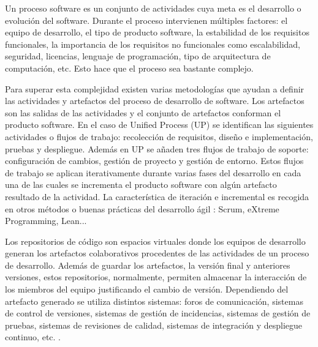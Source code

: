 

Un proceso software es un conjunto de actividades cuya meta es el desarrollo o evolución del software. Durante el proceso intervienen múltiples factores: el equipo de desarrollo, el tipo de producto software, la estabilidad de los requisitos funcionales, la importancia de los requisitos no funcionales como escalabilidad, seguridad, licencias, lenguaje de programación, tipo de arquitectura de computación, etc. Esto hace que el proceso sea bastante complejo.

Para superar esta complejidad existen varias metodologías que ayudan a definir las actividades y artefactos del proceso de desarrollo de software. Los artefactos son las salidas de las actividades y el conjunto de artefactos conforman el producto software. En el caso de  Unified Process (UP) \cite{jacobson_proceso_2000} se identifican las siguientes actividades o flujos de trabajo: recolección de requisitos, diseño e implementación, pruebas y despliegue. Además en UP se añaden tres flujos de trabajo de soporte: configuración de cambios, gestión de proyecto y gestión de entorno. Estos flujos de trabajo se aplican iterativamente durante varias fases del desarrollo en cada una de las cuales se incrementa el producto software con algún artefacto resultado de la actividad. La característica de iteración e incremental es recogida en otros métodos o buenas prácticas del desarrollo ágil \cite{noauthor_scrum_2019}: Scrum, eXtreme Programming, Lean...


Los repositorios de código son espacios virtuales donde los equipos de desarrollo generan los artefactos colaborativos procedentes de las actividades de un proceso de desarrollo. Además de guardar los artefactos, la versión final y anteriores versiones, estos repositorios, normalmente, permiten almacenar la interacción de los miembros del equipo justificando el cambio de versión. Dependiendo del artefacto generado se utiliza distintos sistemas: foros de comunicación, sistemas de control de versiones, sistemas de gestión de incidencias, sistemas de gestión de pruebas, sistemas de revisiones de calidad, sistemas de integración y despliegue continuo, etc. \cite{guemes-pena_emerging_2018}.

